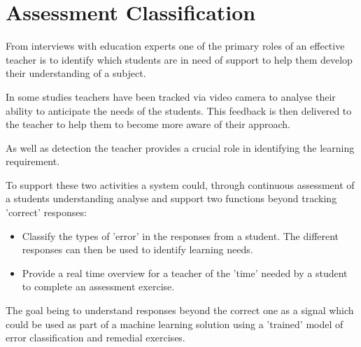 \section{Assessment Classification}

From interviews with education experts one of the primary roles of an effective
teacher is to identify which students are in need of support to help them 
develop their understanding of a subject. 

In some studies teachers have been tracked via video camera to analyse their 
ability to anticipate the needs of the students. This feedback is then delivered
to the teacher to help them to become more aware of their approach.

As well as detection the teacher provides a crucial role in identifying the 
learning requirement.

To support these two activities a system could, through continuous assessment
of a students understanding analyse and support two functions beyond tracking
'correct' responses:

\begin{itemize}
\item Classify the types of 'error' in the responses from a student. The 
different responses can then be used to identify learning needs.
\item Provide a real time overview for a teacher of the 'time' needed by a student to complete an assessment exercise.
\end{itemize}

The goal being to understand responses beyond the correct one as a signal which
could be used as part of a machine learning solution using a 'trained' model 
of error classification and remedial exercises.


